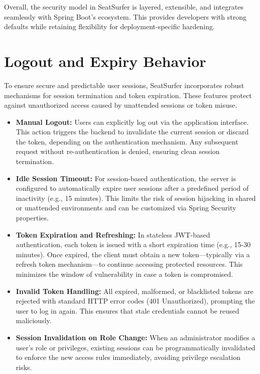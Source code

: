\documentclass[12pt,a4paper]{report} %
\begin{document}
Overall, the security model in SeatSurfer is layered, extensible, and integrates seamlessly with Spring Boot's ecosystem. This provides developers with strong defaults while retaining flexibility for deployment-specific hardening.

\section{Logout and Expiry Behavior}

To ensure secure and predictable user sessions, SeatSurfer incorporates robust mechanisms for session termination and token expiration. These features protect against unauthorized access caused by unattended sessions or token misuse.

\begin{itemize}
\item \textbf{Manual Logout:}
Users can explicitly log out via the application interface. This action triggers the backend to invalidate the current session or discard the token, depending on the authentication mechanism. Any subsequent request without re-authentication is denied, ensuring clean session termination.
\item \textbf{Idle Session Timeout:}  
For session-based authentication, the server is configured to automatically expire user sessions after a predefined period of inactivity (e.g., 15 minutes). This limits the risk of session hijacking in shared or unattended environments and can be customized via Spring Security properties.

\item \textbf{Token Expiration and Refreshing:}  
In stateless JWT-based authentication, each token is issued with a short expiration time (e.g., 15-30 minutes). Once expired, the client must obtain a new token—typically via a refresh token mechanism—to continue accessing protected resources. This minimizes the window of vulnerability in case a token is compromised.

\item \textbf{Invalid Token Handling:}  
All expired, malformed, or blacklisted tokens are rejected with standard HTTP error codes (401 Unauthorized), prompting the user to log in again. This ensures that stale credentials cannot be reused maliciously.

\item \textbf{Session Invalidation on Role Change:}  
When an administrator modifies a user’s role or privileges, existing sessions can be programmatically invalidated to enforce the new access rules immediately, avoiding privilege escalation risks.
\end{itemize}
\end{document}
